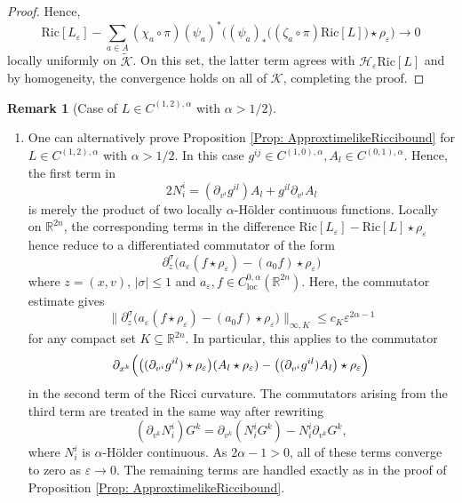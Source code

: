 \documentclass[a4paper,11pt]{article}
\numberwithin{equation}{section}
\theoremstyle{definition}
\newtheorem{Remark}[Definition]{Remark}
\theoremstyle{plain}
\newcommand{\R}{\mathbb R}
\newcommand{\eps}{\varepsilon}
\newcommand{\Ric}{\mathrm{Ric}}
\newcommand{\loc}{\mathrm{loc}}
\begin{document}
\begin{proof}
Hence,
\begin{equation*}
    \Ric[L_\eps] - \sum_{a \in A} (\chi_a \circ \pi) (\psi_a)^{*} \bigl( (\psi_a)_*\bigl( (\zeta_a \circ \pi) \Ric[L] \bigr) \star \rho_\eps \bigr) \rightarrow 0
\end{equation*}
locally uniformly on $\widetilde{\mathcal{K}}$.
On this set, the latter term agrees with $\mathcal{H}_\eps \Ric[L]$ and by homogeneity, the convergence holds on all of $\mathcal K$, completing the proof.
\end{proof}

\begin{Remark}[Case of $L \in C^{(1,2),\alpha}$ with $\alpha>1/2$]\label{rm:12alpha}
\begin{enumerate}
\item[(a)]
One can alternatively prove Proposition \ref{Prop: ApproxtimelikeRiccibound} for $L \in C^{(1,2),\alpha}$ with $\alpha > 1/2$. 
In this case $g^{ij}\in C^{(1,0),\alpha}, A_l\in C^{(0,1),\alpha}$.
Hence, the first term in
\[
2N^i_i =(\partial_{v^i} g^{il}) A_l +g^{il} \partial_{v^i} A_l
\]
is merely the product of two locally $\alpha$-H\"older continuous functions.
Locally on $\R^{2n}$, the corresponding terms in the difference $\Ric[L_\eps] - \Ric[L]\star\rho_\eps$ hence reduce to a differentiated commutator of the form
\begin{equation*}
    \partial_z^{\sigma} \bigl(a_\eps(f \star \rho_\eps) - (a_0f) \star \rho_\eps \bigr)
\end{equation*}
where $z=(x,v)$, $| \sigma| \leq 1$ and $a_\eps,f\in C^{0,\alpha}_{\loc}(\R^{2n})$.
Here, the commutator estimate gives
    \begin{equation*}
        \bigl\|\partial_z^{\sigma} \bigl(a_\eps(f \star \rho_\eps) - (a_0f) \star \rho_\eps \bigr)\bigr\|_{\infty, K} \leq c_K \eps^{2 \alpha - 1}
    \end{equation*}
for any compact set $K \subseteq \R^{2n}$.
In particular, this applies to the commutator
\begin{equation*}
        \partial_{x^k} \Bigl( \bigl( (\partial_{v^i} g^{il}) \star \rho_\eps \bigr) (A_l \star \rho_\eps) -\bigl( (\partial_{v^i} g^{il}) A_l \bigr)\star \rho_\eps \Bigr)
    \end{equation*}
    in the second term of the Ricci curvature.
    The commutators arising from the third term are treated in the same way after rewriting
    \begin{equation*}
        (\partial_{v^k} N_i^{i}) G^k = \partial_{v^k}(N_i^{i}G^k) - N_i^{i} \partial_{v^k} G^k,
    \end{equation*}
    where $N^i_i$ is $\alpha$-H\"older continuous.
    As $2 \alpha -1 >0$, all of these terms converge to zero as $\eps \rightarrow 0$.
    The remaining terms are handled exactly as in the proof of Proposition \ref{Prop: ApproxtimelikeRiccibound}.


\end{enumerate}
\end{Remark}
\end{document}
